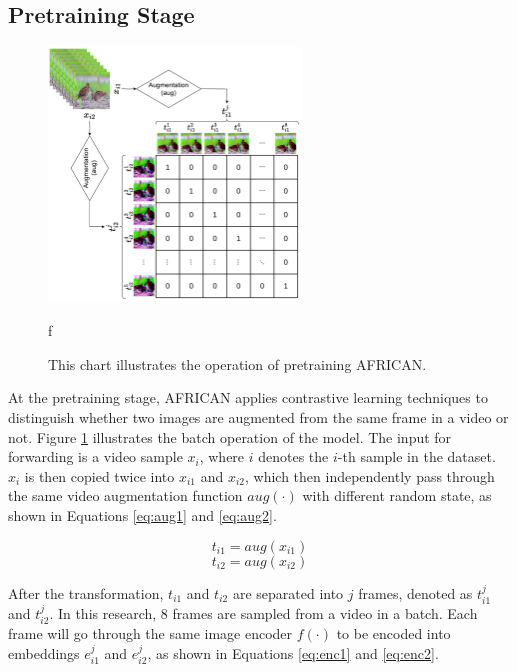 \subsection{Pretraining Stage}

\begin{figure}[ht]
    \centering
    \includegraphics[width=0.6\textwidth]{assets/imgs/3_3_ConstrastiveSimilarityMatrix}
    \caption[Operation of pretraining AFRICAN]{This chart illustrates the operation of pretraining AFRICAN.}
f\label{fig:modelstructafsim}
\end{figure}

At the pretraining stage, AFRICAN applies contrastive learning techniques to distinguish whether two images are augmented from the same frame in a video or not. Figure \ref{fig:modelstructafsim} illustrates the batch operation of the model. The input for forwarding is a video sample $x_i$, where $i$ denotes the $i$-th sample in the dataset. $x_i$ is then copied twice into $x_{i1}$ and $x_{i2}$, which then independently pass through the same video augmentation function $aug(\cdot)$ with different random state, as shown in Equations \ref{eq:aug1} and \ref{eq:aug2}. 

\begin{equation}
    \label{eq:aug1}
    t_{i1} = aug(x_{i1})
\end{equation}
\begin{equation}
    \label{eq:aug2}
    t_{i2} = aug(x_{i2})
\end{equation}

After the transformation, $t_{i1}$ and $t_{i2}$ are separated into $j$ frames, denoted as $t_{i1}^j$ and $t_{i2}^j$. In this research, 8 frames are sampled from a video in a batch. Each frame will go through the same image encoder $f(\cdot)$ to be encoded into embeddings $e_{i1}^j$ and $e_{i2}^j$, as shown in Equations \ref{eq:enc1} and \ref{eq:enc2}.

